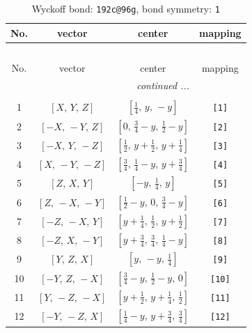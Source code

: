 \documentclass[fleqn,8pt]{jsarticle}
\begin{document}
\begin{longtable}{cccc}
\caption{Wyckoff bond: {\tt 192c@96g}, bond symmetry: {\tt 1}}
 \\
 \hline \hline
No. & vector & center & mapping \\ \hline \endfirsthead

\multicolumn{3}{l}{\tablename\ \thetable{}} \\
 \hline \hline
No. & vector & center & mapping \\ \hline \endhead

 \hline \hline
\multicolumn{3}{r}{\footnotesize\it continued ...} \\ \endfoot

 \hline \hline
\multicolumn{3}{r}{} \\ \endlastfoot

1 & $\left[ X,\, Y,\, Z \right]$ & $\left[ \frac{1}{4},\, y,\, - y \right]$ & {\tt [1]} \\ \hline
2 & $\left[ - X,\, - Y,\, Z \right]$ & $\left[ 0,\, \frac{3}{4} - y,\, \frac{1}{2} - y \right]$ & {\tt [2]} \\ \hline
3 & $\left[ - X,\, Y,\, - Z \right]$ & $\left[ \frac{1}{2},\, y + \frac{1}{2},\, y + \frac{1}{4} \right]$ & {\tt [3]} \\ \hline
4 & $\left[ X,\, - Y,\, - Z \right]$ & $\left[ \frac{3}{4},\, \frac{1}{4} - y,\, y + \frac{3}{4} \right]$ & {\tt [4]} \\ \hline
5 & $\left[ Z,\, X,\, Y \right]$ & $\left[ - y,\, \frac{1}{4},\, y \right]$ & {\tt [5]} \\ \hline
6 & $\left[ Z,\, - X,\, - Y \right]$ & $\left[ \frac{1}{2} - y,\, 0,\, \frac{3}{4} - y \right]$ & {\tt [6]} \\ \hline
7 & $\left[ - Z,\, - X,\, Y \right]$ & $\left[ y + \frac{1}{4},\, \frac{1}{2},\, y + \frac{1}{2} \right]$ & {\tt [7]} \\ \hline
8 & $\left[ - Z,\, X,\, - Y \right]$ & $\left[ y + \frac{3}{4},\, \frac{3}{4},\, \frac{1}{4} - y \right]$ & {\tt [8]} \\ \hline
9 & $\left[ Y,\, Z,\, X \right]$ & $\left[ y,\, - y,\, \frac{1}{4} \right]$ & {\tt [9]} \\ \hline
10 & $\left[ - Y,\, Z,\, - X \right]$ & $\left[ \frac{3}{4} - y,\, \frac{1}{2} - y,\, 0 \right]$ & {\tt [10]} \\ \hline
11 & $\left[ Y,\, - Z,\, - X \right]$ & $\left[ y + \frac{1}{2},\, y + \frac{1}{4},\, \frac{1}{2} \right]$ & {\tt [11]} \\ \hline
12 & $\left[ - Y,\, - Z,\, X \right]$ & $\left[ \frac{1}{4} - y,\, y + \frac{3}{4},\, \frac{3}{4} \right]$ & {\tt [12]} \\ \hline

\end{longtable}
\end{document}
